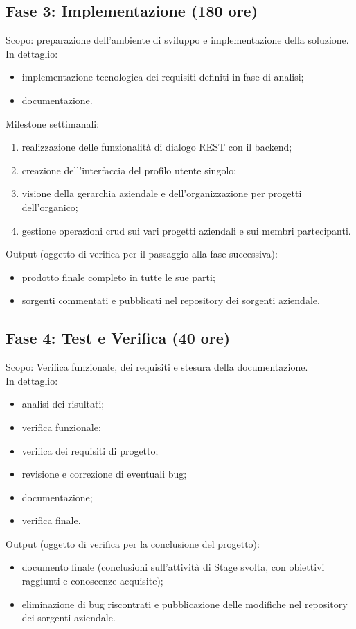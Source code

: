 \subsection{Fase 3: Implementazione (180 ore)}
Scopo: preparazione dell’ambiente di sviluppo e implementazione della soluzione.\\
In dettaglio:
\begin{itemize}
	\item implementazione tecnologica dei requisiti definiti in fase di analisi;
	\item documentazione.
\end{itemize}
Milestone settimanali:
\begin{enumerate}
	\item realizzazione delle funzionalità di dialogo REST con il backend;
	\item creazione dell'interfaccia del profilo utente singolo;
	\item visione della gerarchia aziendale e dell'organizzazione per progetti dell'organico;
	\item gestione operazioni \gls{crud} sui vari progetti aziendali e sui membri partecipanti.
\end{enumerate}
Output (oggetto di verifica per il passaggio alla fase successiva):
\begin{itemize}
	\item prodotto finale completo in tutte le sue parti;
	\item sorgenti commentati e pubblicati nel repository dei sorgenti aziendale.
\end{itemize}

\subsection{Fase 4: Test e Verifica (40 ore)}
Scopo: Verifica funzionale, dei requisiti e stesura della documentazione.\\
In dettaglio:
\begin{itemize}
	\item analisi dei risultati;
	\item verifica funzionale;
	\item verifica dei requisiti di progetto;
	\item revisione e correzione di eventuali bug;
	\item documentazione;
	\item verifica finale.
\end{itemize}
Output (oggetto di verifica per la conclusione del progetto):
\begin{itemize}
	\item documento finale (conclusioni sull'attività di Stage svolta, con obiettivi raggiunti e
conoscenze acquisite);
	\item eliminazione di bug riscontrati e pubblicazione delle modifiche nel repository dei sorgenti aziendale.
\end{itemize}